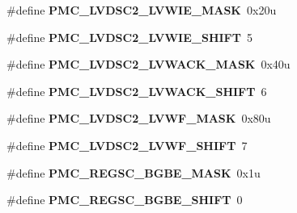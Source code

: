 \begin{DoxyCompactItemize}
\item 
\hypertarget{group___p_m_c___register___masks_ga3a9de69524d99d6ec8985d211bc7861d}{}\#define {\bfseries P\+M\+C\+\_\+\+L\+V\+D\+S\+C2\+\_\+\+L\+V\+W\+I\+E\+\_\+\+M\+A\+S\+K}~0x20u\label{group___p_m_c___register___masks_ga3a9de69524d99d6ec8985d211bc7861d}

\item 
\hypertarget{group___p_m_c___register___masks_gaf5cb9cf53bade8254aa7749b5eb36eff}{}\#define {\bfseries P\+M\+C\+\_\+\+L\+V\+D\+S\+C2\+\_\+\+L\+V\+W\+I\+E\+\_\+\+S\+H\+I\+F\+T}~5\label{group___p_m_c___register___masks_gaf5cb9cf53bade8254aa7749b5eb36eff}

\item 
\hypertarget{group___p_m_c___register___masks_ga8b0c8bcad4d38e6ff797e9bc3d9db6d7}{}\#define {\bfseries P\+M\+C\+\_\+\+L\+V\+D\+S\+C2\+\_\+\+L\+V\+W\+A\+C\+K\+\_\+\+M\+A\+S\+K}~0x40u\label{group___p_m_c___register___masks_ga8b0c8bcad4d38e6ff797e9bc3d9db6d7}

\item 
\hypertarget{group___p_m_c___register___masks_ga99ad1d373a7be7591a7ee3577bed5374}{}\#define {\bfseries P\+M\+C\+\_\+\+L\+V\+D\+S\+C2\+\_\+\+L\+V\+W\+A\+C\+K\+\_\+\+S\+H\+I\+F\+T}~6\label{group___p_m_c___register___masks_ga99ad1d373a7be7591a7ee3577bed5374}

\item 
\hypertarget{group___p_m_c___register___masks_ga34187b0598a3e166a457818770a616d4}{}\#define {\bfseries P\+M\+C\+\_\+\+L\+V\+D\+S\+C2\+\_\+\+L\+V\+W\+F\+\_\+\+M\+A\+S\+K}~0x80u\label{group___p_m_c___register___masks_ga34187b0598a3e166a457818770a616d4}

\item 
\hypertarget{group___p_m_c___register___masks_ga8bcfb9fc5fd4a92164b2aa6cdb6db77e}{}\#define {\bfseries P\+M\+C\+\_\+\+L\+V\+D\+S\+C2\+\_\+\+L\+V\+W\+F\+\_\+\+S\+H\+I\+F\+T}~7\label{group___p_m_c___register___masks_ga8bcfb9fc5fd4a92164b2aa6cdb6db77e}

\item 
\hypertarget{group___p_m_c___register___masks_ga98cf5c98c133e20fb620faa6ca29d98e}{}\#define {\bfseries P\+M\+C\+\_\+\+R\+E\+G\+S\+C\+\_\+\+B\+G\+B\+E\+\_\+\+M\+A\+S\+K}~0x1u\label{group___p_m_c___register___masks_ga98cf5c98c133e20fb620faa6ca29d98e}

\item 
\hypertarget{group___p_m_c___register___masks_ga2e23aa8155158c86fc53ccd8baccf24d}{}\#define {\bfseries P\+M\+C\+\_\+\+R\+E\+G\+S\+C\+\_\+\+B\+G\+B\+E\+\_\+\+S\+H\+I\+F\+T}~0\label{group___p_m_c___register___masks_ga2e23aa8155158c86fc53ccd8baccf24d}


\end{DoxyCompactItemize}
